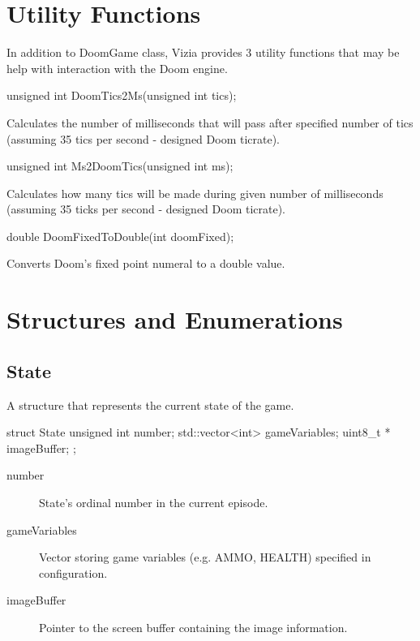 \section {Utility Functions}
In addition to DoomGame class, Vizia provides 3 utility functions that may be help with interaction with the Doom engine.

\vspace{20pt}
\begin{clinee}
unsigned int DoomTics2Ms(unsigned int tics);
\end{clinee}
	Calculates the number of milliseconds that will pass after specified number of tics (assuming 35 tics per second - designed Doom ticrate).


\vspace{20pt}
\begin{clinee}
unsigned int Ms2DoomTics(unsigned int ms);
\end{clinee}

	Calculates how many tics will be made during given number of milliseconds (assuming 35 ticks per second - designed Doom ticrate).


\vspace{20pt}
\begin{clinee}
double DoomFixedToDouble(int doomFixed);
\end{clinee}
	Converts Doom's fixed point numeral to a double value.


\vspace{20pt}
\section{Structures and Enumerations} \label{sec:structs}
\subsection{State}

A structure that represents the current state of the game.

\vspace{20pt}	
\begin{clinee}
	struct State {
	    unsigned int number; 
	    std::vector<int> gameVariables;
	    uint8_t * imageBuffer;
	};
\end{clinee}
\begin{description}
	\item[number] State's ordinal number in the current episode.
	\item[gameVariables] Vector storing game variables (e.g. AMMO, HEALTH) specified in configuration. 
	\item[imageBuffer] Pointer to the screen buffer containing the image information.
\end{description}
